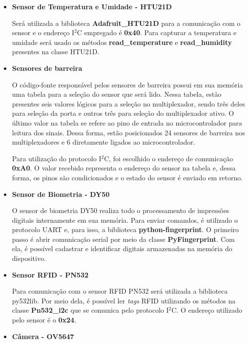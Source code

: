 \begin{itemize}
    \item \textbf{Sensor de Temperatura e Umidade - HTU21D}
    
    Será utilizada a biblioteca \textbf{Adafruit\_HTU21D} para a comunicação com o sensor e o endereço I$^2$C empregado é \textbf{0x40}. Para capturar a temperatura e umidade será usado os métodos  \textbf{read\_temperature} e \textbf{read\_humidity} presentes na classe HTU21D.
    
    
    \item \textbf{Sensores de barreira}
    
    O código-fonte responsável pelos sensores de barreira possui em sua memória uma tabela para a seleção do sensor que será lido. Nessa tabela, estão presentes seis valores lógicos para a seleção no multiplexador, sendo três deles para seleção da porta e outros três para seleção do multiplexador ativo. O último valor na tabela se refere ao pino de entrada no microcontrolador para leitura dos sinais. Dessa forma, estão posicionados 24 sensores de barreira nos multiplexadores e 6 diretamente ligados ao microcontrolador.
    
    Para utilização do protocolo I$^2$C, foi escolhido o endereço de comunicação \textbf{0xA0}. O valor recebido representa o endereço do sensor na tabela e, dessa forma, os pinos são condicionados e o estado do sensor é enviado em retorno.
    
    \item \textbf{Sensor de Biometria - DY50}
    
    O sensor de biometria DY50 realiza todo o processamento de impressões digitais internamente em sua memória. Para enviar comandos, é utilizado o protocolo UART e, para isso, a biblioteca \textbf{python-fingerprint}. O primeiro passo é abrir comunicação serial por meio da classe \textbf{PyFingerprint}. Com ela, é possível cadastrar e identificar digitais armazenadas na memória do dispositivo.
    
    \item \textbf{Sensor RFID - PN532}
    
    Para comunicação com o sensor RFID PN532 será utilizada a biblioteca py532lib. Por meio dela, é possível ler \textit{tags} RFID utilizando os métodos na classe \textbf{Pn532\_i2c} que se comunica pelo protocolo I$^2$C. O endereço utilizado pelo sensor é o \textbf{0x24}. 
    
    \newpage
    
    \item \textbf{Câmera - OV5647}
    

\end{itemize}
